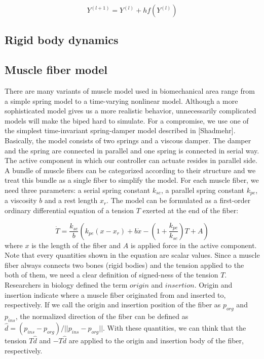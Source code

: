 \documentclass[a4paper,10pt]{article}
\begin{document}
\begin{equation}
Y^{(l+1)}=Y^{(l)}+hf(Y^{(l)})
\end{equation}

\subsection{Rigid body dynamics}

\subsection{Muscle fiber model}

There are many variants of muscle model used in biomechanical area range
from a simple spring model to a time-varying nonlinear model. Although
a more sophisticated model gives us a more realistic behavior, unnecessarily
complicated models will make the biped hard to simulate. For a compromise,
we use one of the simplest time-invariant spring-damper model described in [Shadmehr].
Basically, the model consists of two springs and a viscous damper.
The damper and the spring are connected in parallel and one spring is
connected in serial way. The active component in which our controller
can actuate resides in parallel side. A bundle of muscle fibers can be
categorized according to their structure and we treat this bundle as
a single fiber to simplify the model. For each muscle fiber, we need three
parameters: a serial spring constant $k_{se}$, a parallel spring constant $k_{pe}$,
a viscosity $b$ and a rest length $x_{r}$. The model can be formulated
as a first-order ordinary differential equation of a tension $T$ exerted
at the end of the fiber:

\begin{equation}\label{muscle-ode}
\dot{T} = \frac{k_{se}}{b} \left( k_{pe}(x-x_{r})+b\dot{x}-\left(1+\frac{k_{pe}}{k_{se}}\right)T+A   \right)
\end{equation}
where $x$ is the length of the fiber and $A$ is applied force in the active
component. Note that every quantities shown in the equation are scalar values.
Since a muscle fiber always connects two bones (rigid bodies) and the
tension applied to the both of them, we need a clear definition of signed-ness
of the tension $T$. Researchers in biology defined the term $origin$ and $insertion$.
Origin and insertion indicate where a muscle fiber originated from and inserted
to, respectively. If we call the origin and insertion position of the fiber
as $p_{org}$ and $p_{ins}$, the normalized direction of the fiber can be
defined as $\hat{d}=(p_{ins}-p_{org})/||p_{ins}-p_{org}||$. With these quantities, we can think that
the tension $T\hat{d}$ and $-T\hat{d}$ are applied to the origin and insertion body
of the fiber, respectively.
\end{document}
